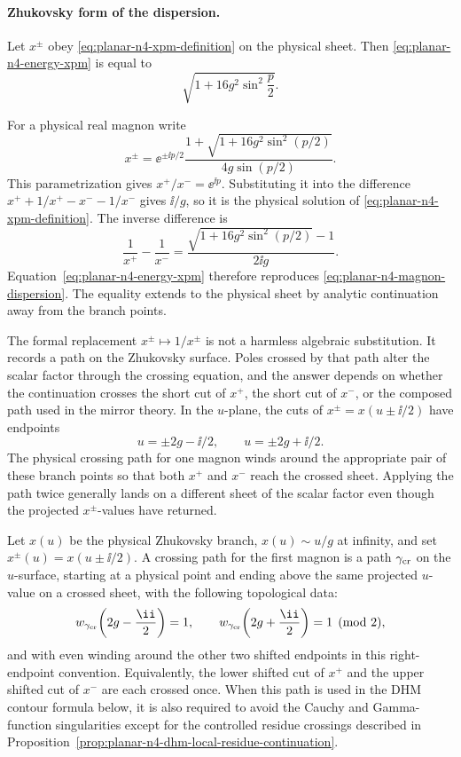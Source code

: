 \paragraph{Zhukovsky form of the dispersion.}
Let \(x^\pm\) obey \eqref{eq:planar-n4-xpm-definition} on the physical sheet.
Then \eqref{eq:planar-n4-energy-xpm} is equal to
\[
  \sqrt{1+16g^2\sin^2\frac p2}.
\]

For a physical real magnon write
\[
  x^\pm
  =
  \ee^{\pm\ii p/2}
  \frac{1+\sqrt{1+16g^2\sin^2(p/2)}}
       {4g\sin(p/2)} .
\]
This parametrization gives \(x^+/x^-=\ee^{\ii p}\).  Substituting it into the
difference \(x^++1/x^+-x^- -1/x^-\) gives \(\ii/g\), so it is the physical
solution of \eqref{eq:planar-n4-xpm-definition}.  The inverse difference is
\[
  \frac1{x^+}-\frac1{x^-}
  =
  \frac{\sqrt{1+16g^2\sin^2(p/2)}-1}{2\ii g}.
\]
Equation~\eqref{eq:planar-n4-energy-xpm} therefore reproduces
\eqref{eq:planar-n4-magnon-dispersion}.  The equality extends to the
physical sheet by analytic continuation away from the branch points.

\begin{warning}
\label{warn:planar-n4-crossing-sheet-data}
The formal replacement \(x^\pm\mapsto1/x^\pm\) is not a harmless algebraic
substitution.  It records a path on the Zhukovsky surface.  Poles crossed by
that path alter the scalar factor through the crossing equation, and the
answer depends on whether the continuation crosses the short cut of \(x^+\),
the short cut of \(x^-\), or the composed path used in the mirror theory.
In the \(u\)-plane, the cuts of \(x^\pm=x(u\pm\ii/2)\) have endpoints
\[
  u=\pm2g-\ii/2,\qquad u=\pm2g+\ii/2 .
\]
The physical crossing path for one magnon winds around the appropriate pair
of these branch points so that both \(x^+\) and \(x^-\) reach the crossed
sheet.  Applying the path twice generally lands on a different sheet of the
scalar factor even though the projected \(x^\pm\)-values have returned.
\end{warning}

\begin{definition}
\label{def:planar-n4-crossing-path}
Let \(x(u)\) be the physical Zhukovsky branch, \(x(u)\sim u/g\) at infinity,
and set \(x^\pm(u)=x(u\pm\ii/2)\).  A crossing path for the first magnon is
a path \(\gamma_{\rm cr}\) on the \(u\)-surface, starting at a physical point
and ending above the same projected \(u\)-value on a crossed sheet, with the
following topological data:
\[
  w_{\gamma_{\rm cr}}\!\left(2g-\frac{\ii}{2}\right)=1,
  \qquad
  w_{\gamma_{\rm cr}}\!\left(2g+\frac{\ii}{2}\right)=1
  \pmod 2,
\]
and with even winding around the other two shifted endpoints in this
right-endpoint convention.  Equivalently, the lower shifted cut of \(x^+\)
and the upper shifted cut of \(x^-\) are each crossed once.  When this path
is used in the DHM contour formula below, it is also required to avoid the
Cauchy and Gamma-function singularities except for the controlled residue
crossings described in
Proposition~\ref{prop:planar-n4-dhm-local-residue-continuation}.
\end{definition}


